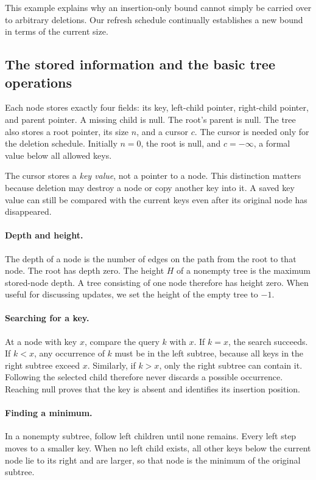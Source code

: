 \documentclass[11pt,a4paper]{article}
\theoremstyle{readable}
\begin{document}
This example explains why an insertion-only bound cannot simply be
carried over to arbitrary deletions. Our refresh schedule continually
establishes a new bound in terms of the current size.

\subsection{The stored information and the basic tree operations}
\label{sec:basics}

Each node stores exactly four fields: its key, left-child pointer,
right-child pointer, and parent pointer. A missing child is null. The
root's parent is null. The tree also stores a root pointer, its size $n$,
and a cursor $c$. The cursor is needed only for the deletion schedule.
Initially $n=0$, the root is null, and $c=-\infty$, a formal value below
all allowed keys.

The cursor stores a \emph{key value}, not a pointer to a node. This
distinction matters because deletion may destroy a node or copy another
key into it. A saved key value can still be compared with the current
keys even after its original node has disappeared.

\paragraph{Depth and height.}
The depth of a node is the number of edges on the path from the root
to that node. The root has depth zero. The height $H$ of a nonempty
tree is the maximum stored-node depth. A tree consisting of one node
therefore has height zero. When useful for discussing updates, we set
the height of the empty tree to $-1$.

\paragraph{Searching for a key.}
At a node with key $x$, compare the query $k$ with $x$. If $k=x$, the
search succeeds. If $k<x$, any occurrence of $k$ must be in the left
subtree, because all keys in the right subtree exceed $x$. Similarly,
if $k>x$, only the right subtree can contain it. Following the selected
child therefore never discards a possible occurrence. Reaching null
proves that the key is absent and identifies its insertion position.

\paragraph{Finding a minimum.}
In a nonempty subtree, follow left children until none remains. Every
left step moves to a smaller key. When no left child exists, all other
keys below the current node lie to its right and are larger, so that
node is the minimum of the original subtree.
\end{document}
